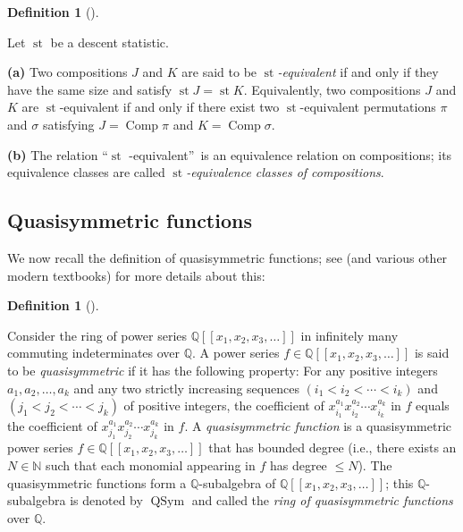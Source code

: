 \documentclass[numbers=enddot,12pt,final,onecolumn,notitlepage]{scrartcl}%
\theoremstyle{definition}
\newtheorem{defi}[theo]{Definition}
\newenvironment{definition}[1][]
{\begin{defi}[#1]\begin{leftbar}}
{\end{leftbar}\end{defi}}
\begin{document}
\begin{definition}
\label{def.des-stat.eq-comp}Let $\operatorname*{st}$ be a descent statistic.

\textbf{(a)} Two compositions $J$ and $K$ are said to be $\operatorname*{st}%
$\textit{-equivalent} if and only if they have the same size and satisfy
$\operatorname*{st}J=\operatorname*{st}K$. Equivalently, two compositions $J$
and $K$ are $\operatorname*{st}$-equivalent if and only if there exist two
$\operatorname*{st}$-equivalent permutations $\pi$ and $\sigma$ satisfying
$J=\operatorname*{Comp}\pi$ and $K=\operatorname*{Comp}\sigma$.

\textbf{(b)} The relation \textquotedblleft$\operatorname*{st}$%
-equivalent\textquotedblright\ is an equivalence relation on compositions; its
equivalence classes are called $\operatorname*{st}$\textit{-equivalence
classes of compositions}.
\end{definition}

\subsection{Quasisymmetric functions}

We now recall the definition of quasisymmetric functions; see \cite[Chapter
5]{HopfComb} (and various other modern textbooks) for more details about this:

\begin{definition}
Consider the ring of power series $\mathbb{Q}\left[  \left[  x_{1},x_{2}%
,x_{3},\ldots\right]  \right]  $ in infinitely many commuting indeterminates
over $\mathbb{Q}$. A power series $f\in\mathbb{Q}\left[  \left[  x_{1}%
,x_{2},x_{3},\ldots\right]  \right]  $ is said to be \textit{quasisymmetric}
if it has the following property: For any positive integers $a_{1}%
,a_{2},\ldots,a_{k}$ and any two strictly increasing sequences $\left(
i_{1}<i_{2}<\cdots<i_{k}\right)  $ and $\left(  j_{1}<j_{2}<\cdots
<j_{k}\right)  $ of positive integers, the coefficient of $x_{i_{1}}^{a_{1}%
}x_{i_{2}}^{a_{2}}\cdots x_{i_{k}}^{a_{k}}$ in $f$ equals the coefficient of
$x_{j_{1}}^{a_{1}}x_{j_{2}}^{a_{2}}\cdots x_{j_{k}}^{a_{k}}$ in $f$. A
\textit{quasisymmetric function} is a quasisymmetric power series
$f\in\mathbb{Q}\left[  \left[  x_{1},x_{2},x_{3},\ldots\right]  \right]  $
that has bounded degree (i.e., there exists an $N\in\mathbb{N}$ such that each
monomial appearing in $f$ has degree $\leq N$). The quasisymmetric functions
form a $\mathbb{Q}$-subalgebra of $\mathbb{Q}\left[  \left[  x_{1},x_{2}%
,x_{3},\ldots\right]  \right]  $; this $\mathbb{Q}$-subalgebra is denoted by
$\operatorname*{QSym}$ and called the \textit{ring of quasisymmetric
functions} over $\mathbb{Q}$.
\end{definition}
\end{document}
